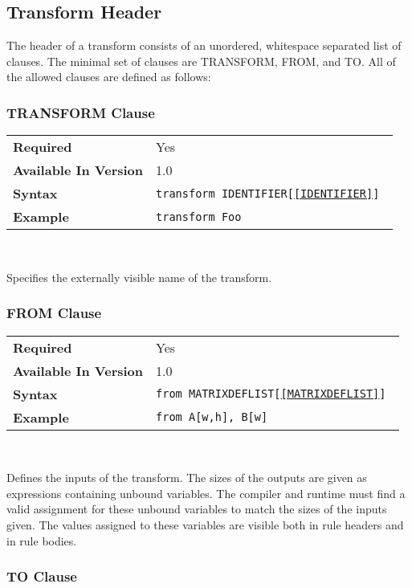\documentclass[11pt]{article}
\begin{document}
\subsection{Transform Header}
\label{sec:transform}

The header of a transform consists of an unordered, whitespace separated
list of clauses.  The minimal set of clauses are TRANSFORM, FROM, and TO.
All of the allowed clauses are defined as follows:

\subsubsection{TRANSFORM Clause}

\begin{tabular}{| l | l |}
\hline
\bf Required & Yes                    \\
\bf Available In Version & 1.0        \\
\bf Syntax & \tt transform IDENTIFIER[\ref{IDENTIFIER}] \\
\bf Example & \tt transform Foo       \\
\hline
\end{tabular}

~

\noindent
Specifies the externally visible name of the transform.

\subsubsection{FROM Clause}

\begin{tabular}{| l | l |}
\hline
\bf Required & Yes                    \\
\bf Available In Version & 1.0        \\
\bf Syntax & \tt from MATRIXDEFLIST[\ref{MATRIXDEFLIST}] \\
\bf Example & \tt from A[w,h], B[w]     \\
\hline
\end{tabular}

~

\noindent
\noindent Defines the inputs of the transform.  The sizes of the outputs
are given as expressions containing unbound variables.  The compiler and
runtime must find a valid assignment for these unbound variables to match
the sizes of the inputs given.  The values assigned to these variables are
visible both in rule headers and in rule bodies.


\subsubsection{TO Clause}
\end{document}
